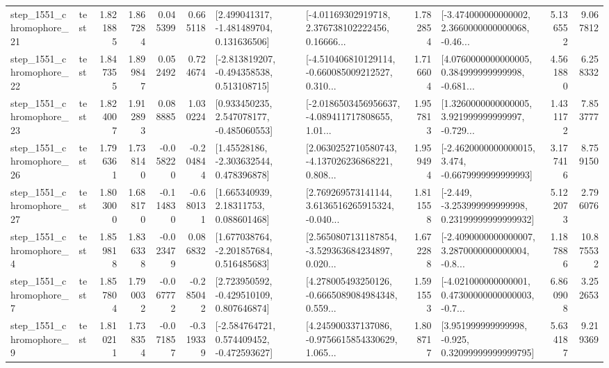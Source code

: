 \begin{tabular}{llrrrrllrlrr}
 step\_1551\_chromophore\_21 &      test &      1.821885 &    1.867284 &      0.045399 &  0.665118 &    [2.499041317, -1.481489704, 0.131636506] &  [-4.01169302919718, 2.376738102222456, 0.16666... &       1.782854 &  [-3.474000000000002, 2.3660000000000068, -0.46... &            5.136552 &          9.067812 \\
 step\_1551\_chromophore\_22 &      test &      1.847355 &    1.899847 &      0.052492 &  0.724674 &   [-2.813819207, -0.494358538, 0.513108715] &  [-4.510406810129114, -0.660085009212527, 0.310... &       1.716604 &  [4.0760000000000005, 0.384999999999998, -0.681... &            4.561880 &          6.258332 \\
 step\_1551\_chromophore\_23 &      test &      1.824007 &    1.912893 &      0.088885 &  1.030224 &    [0.933450235, 2.547078177, -0.485060553] &  [-2.0186503456956637, -4.089411717808655, 1.01... &       1.957813 &  [1.3260000000000005, 3.921999999999997, -0.729... &            1.431172 &          7.853777 \\
 step\_1551\_chromophore\_26 &      test &      1.796361 &    1.738140 &     -0.058220 & -0.204844 &     [1.45528186, -2.303632544, 0.478396878] &  [2.0630252710580743, -4.137026236868221, 0.808... &       1.959494 &  [-2.4620000000000015, 3.474, -0.6679999999999993] &            3.177416 &          8.759150 \\
 step\_1551\_chromophore\_27 &      test &      1.803000 &    1.688170 &     -0.114830 & -0.680131 &      [1.665340939, 2.18311753, 0.088601468] &  [2.769269573141144, 3.6136516265915324, -0.040... &       1.811558 &  [-2.449, -3.253999999999998, 0.23199999999999932] &            5.122073 &          2.796076 \\
  step\_1551\_chromophore\_4 &      test &      1.859818 &    1.836338 &     -0.023479 &  0.086832 &    [1.677038764, -2.201857684, 0.516485683] &  [2.5650807131187854, -3.529363684234897, 0.020... &       1.672288 &  [-2.4090000000000007, 3.2870000000000004, -0.8... &            1.187886 &         10.875532 \\
  step\_1551\_chromophore\_7 &      test &      1.857804 &    1.790032 &     -0.067772 & -0.285042 &    [2.723950592, -0.429510109, 0.807646874] &  [4.278005493250126, -0.6665089084984348, 0.559... &       1.591553 &  [-4.021000000000001, 0.47300000000000003, -0.7... &            6.860908 &          3.252653 \\
  step\_1551\_chromophore\_9 &      test &      1.810211 &    1.738354 &     -0.071857 & -0.319339 &   [-2.584764721, 0.574409452, -0.472593627] &  [4.245900337137086, -0.9756615854330629, 1.065... &       1.808717 &   [3.951999999999998, -0.925, 0.32099999999999795] &            5.634187 &          9.219369 \\

\end{tabular}
